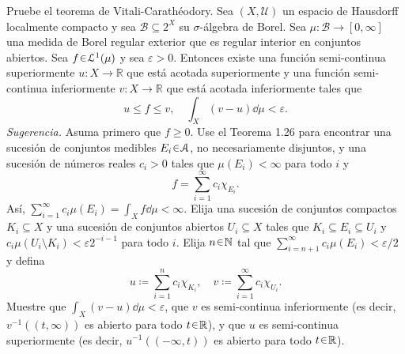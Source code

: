 \setcounter{neje}{21}
\begin{nejer}
Pruebe el teorema de Vitali-Carathéodory. Sea $(X, \mathcal{U})$ un espacio de Hausdorff localmente compacto y sea $\mathcal{B} \subseteq 2^X$ su $\sigma$-álgebra de Borel. Sea $\mu \colon \mathcal{B} \to [0, \infty]$ una medida de Borel regular exterior que es regular interior en conjuntos abiertos. Sea $f \en \mathcal{L}^1(\mu)$ y sea $\varepsilon > 0$. Entonces existe una función semi-continua superiormente $u \colon X \to \mathbb{R}$ que está acotada superiormente y una función semi-continua inferiormente $v \colon X \to \mathbb{R}$ que está acotada inferiormente tales que
$$
u \le f \le v, \quad \int_X (v - u) \dd{\mu} < \varepsilon.
$$
\emph{Sugerencia.} Asuma primero que $f \ge 0$. Use el Teorema 1.26 para encontrar una sucesión de conjuntos medibles $E_i \en \mathcal{A}$, no necesariamente disjuntos, y una sucesión de números reales $c_i > 0$ tales que $\mu(E_i) < \infty$ para todo $i$ y
$$
f = \sum_{i=1}^\infty c_i \chi_{E_i}.
$$
Así, $\sum_{i=1}^\infty c_i \mu(E_i) = \int_X f \dd{\mu} < \infty$. Elija una sucesión de conjuntos compactos $K_i \subseteq X$ y una sucesión de conjuntos abiertos $U_i \subseteq X$ tales que $K_i \subseteq E_i \subseteq U_i$ y $c_i \mu(U_i \setminus K_i) < \varepsilon 2^{-i-1}$ para todo $i$. Elija $n \en \mathbb{N}$ tal que $\sum_{i=n+1}^\infty c_i \mu(E_i) < \varepsilon/2$ y defina
$$
u \coloneq \sum_{i=1}^n c_i \chi_{K_i}, \quad v \coloneq \sum_{i=1}^\infty c_i \chi_{U_i}.
$$
Muestre que $\int_X (v - u) \dd{\mu} < \varepsilon$, que $v$ es semi-continua inferiormente (es decir, $v^{-1}((t, \infty))$ es abierto para todo $t \en \mathbb{R}$), y que $u$ es semi-continua superiormente (es decir, $u^{-1}((-\infty, t))$ es abierto para todo $t \en \mathbb{R}$).
\end{nejer}
